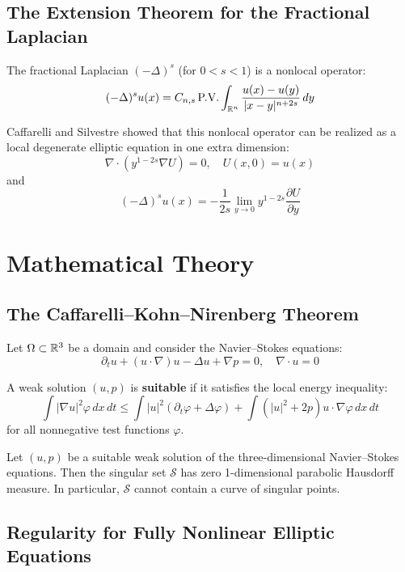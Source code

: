 \subsection{The Extension Theorem for the Fractional Laplacian}

The fractional Laplacian $(-\Delta)^s$ (for $0 < s < 1$) is a nonlocal operator:
\[
(-\Delta)^s u(x) = C_{n,s} \, \text{P.V.} \int_{\mathbb{R}^n} \frac{u(x) - u(y)}{|x-y|^{n+2s}} \, dy
\]

Caffarelli and Silvestre showed that this nonlocal operator can be realized as a local degenerate elliptic equation in one extra dimension:
\[
\nabla \cdot (y^{1-2s} \nabla U) = 0, \quad U(x,0) = u(x)
\]
and
\[
(-\Delta)^s u(x) = - \frac{1}{2s} \lim_{y\to 0} y^{1-2s} \frac{\partial U}{\partial y}
\]

\section{Mathematical Theory}

\subsection{The Caffarelli--Kohn--Nirenberg Theorem}

Let $\Omega \subset \mathbb{R}^3$ be a domain and consider the Navier--Stokes equations:
\[
\partial_t u + (u \cdot \nabla) u - \Delta u + \nabla p = 0, \quad \nabla \cdot u = 0
\]

\begin{definition}
A weak solution $(u,p)$ is \textbf{suitable} if it satisfies the local energy inequality:
\[
\int |\nabla u|^2 \varphi \, dx\,dt \leq \int |u|^2 (\partial_t \varphi + \Delta \varphi) + \int (|u|^2 + 2p) u \cdot \nabla \varphi \, dx\,dt
\]
for all nonnegative test functions $\varphi$.
\end{definition}

\begin{theorem}
Let $(u,p)$ be a suitable weak solution of the three-dimensional Navier--Stokes equations. Then the singular set $\mathcal{S}$ has zero 1-dimensional parabolic Hausdorff measure. In particular, $\mathcal{S}$ cannot contain a curve of singular points.
\end{theorem}

\subsection{Regularity for Fully Nonlinear Elliptic Equations}

